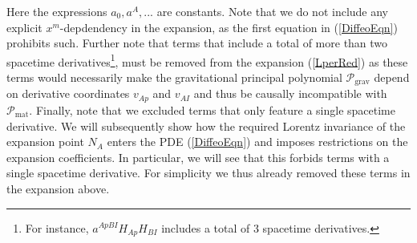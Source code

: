 \documentclass[%
 reprint,
nofootinbib,
 amsmath,amssymb,
 aps,
 prd,
floatfix,
]{revtex4-2}
\begin{document}
Here the expressions $a_0, a^{A},...$ are constants.
Note that we do not include any explicit $x^m$-depdendency in the expansion, as the first equation in (\ref{DiffeoEqn}) prohibits such. 
Further note that terms that include a total of more than two spacetime derivatives\footnote{For instance, $a^{ApBI}H_{Ap}H_{BI}$ includes a total of $3$ spacetime derivatives.},  must be removed from the expansion (\ref{LperRed}) as these terms would necessarily make the gravitational principal polynomial $\mathcal{P}_{\text{grav}}$ depend on derivative coordinates $v_{Ap}$ and $v_{AI}$ and thus be causally incompatible with $\mathcal{P}_{\text{mat}}$.
Finally, note that we excluded terms that only feature a single spacetime derivative. We will subsequently show how the required Lorentz invariance of the expansion point $N_A$ enters the PDE (\ref{DiffeoEqn}) and imposes restrictions on the expansion coefficients. In particular, we will see that this forbids terms with a single spacetime derivative. For simplicity we thus already removed these terms in the expansion above.
\end{document}
